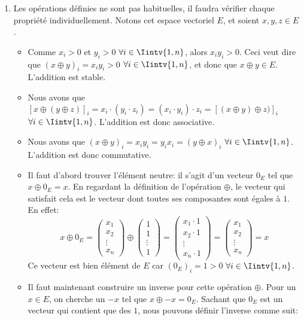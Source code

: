 \begin{exercice}
\begin{enumerate}
    \item Les opérations définies ne sont pas habituelles, il faudra vérifier chaque propriété individuellement. Notons cet espace vectoriel $E$, et soient $x,y,z \in E$. 
    \begin{itemize}
        \item Comme $x_i > 0$ et $y_i > 0$ $\forall i \in \Iintv{1,n}$, alors $x_i y_i > 0$. Ceci veut dire que $(x \oplus y)_i = x_i y_i > 0$ $\forall i \in \Iintv{1,n}$, et donc que $x \oplus y \in E$. L'addition est stable.
        \item Nous avons que $[x \oplus (y \oplus z)]_i = x_i \cdot (y_i \cdot z_i) = (x_i \cdot y_i) \cdot z_i = [(x \oplus y) \oplus z)]_i$ $\forall i \in \Iintv{1,n}$. L'addition est donc associative.
        \item Nous avons que $(x\oplus y)_i = x_i y_i = y_i x_i = (y \oplus x)_i$ $\forall i \in \Iintv{1,n}$. L'addition est donc commutative.
        \item Il faut d'abord trouver l'élément neutre: il s'agit d'un vecteur $0_E$ tel que $x \oplus 0_E = x$. En regardant la définition de l'opération $\oplus$, le vecteur qui satisfait cela est le vecteur dont toutes ses composantes sont égales à $1$. En effet:
        $$x \oplus 0_E = \begin{pmatrix}
            x_1 \\ x_2 \\ \vdots \\ x_n
        \end{pmatrix} \oplus 
        \begin{pmatrix}
            1 \\ 1 \\ \vdots \\ 1
        \end{pmatrix} =
        \begin{pmatrix}
            x_1 \cdot 1 \\ x_2 \cdot 1 \\ \vdots \\ x_n \cdot 1
        \end{pmatrix} =
        \begin{pmatrix}
            x_1 \\ x_2 \\ \vdots \\ x_n
        \end{pmatrix} = x$$
        Ce vecteur est bien élément de $E$ car $(0_E)_i = 1 > 0$ $\forall i \in \Iintv{1,n}$.
        \item Il faut maintenant construire un inverse pour cette opération $\oplus$. Pour un $x \in E$, on cherche un $-x$ tel que $x \oplus -x = 0_E$. Sachant que $0_E$ est un vecteur qui contient que des $1$, nous pouvons définir l'inverse comme suit:

\end{itemize}
\end{enumerate}
\end{exercice}
